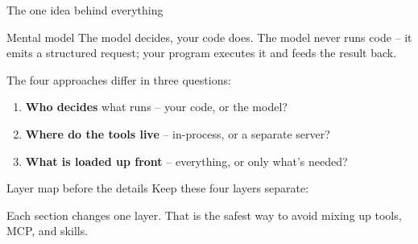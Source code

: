 \documentclass[aspectratio=169,10pt]{beamer}
\begin{document}
\begin{frame}{The one idea behind everything}
  \begin{block}{Mental model}
    \alert{The model decides, your code does.} The model never runs code -- it emits a
    structured request; your program executes it and feeds the result back.
  \end{block}
  \vfill
  The four approaches differ in \alert{three questions}:
  \begin{enumerate}
    \item \textbf{Who decides} what runs -- your code, or the model?
    \item \textbf{Where do the tools live} -- in-process, or a separate server?
    \item \textbf{What is loaded up front} -- everything, or only what's needed?
  \end{enumerate}
\end{frame}

\begin{frame}[fragile]{Layer map before the details}
  Keep these four layers separate:
  \begin{center}
  \end{center}
  \footnotesize Each section changes \alert{one layer}. That is the safest way to avoid mixing up tools, MCP, and skills.
\end{frame}
\end{document}
